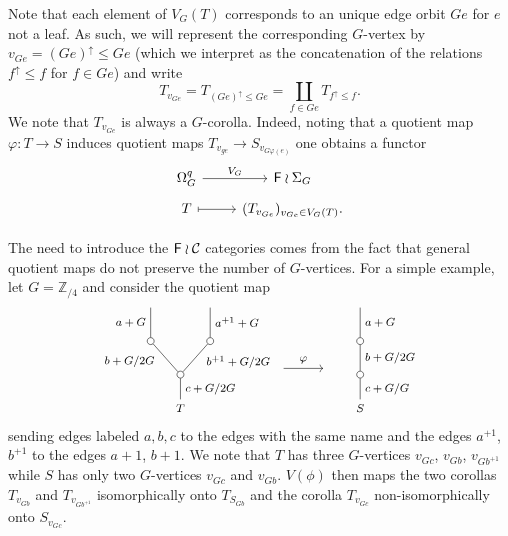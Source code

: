 \documentclass[a4paper,10pt]{article}%
\begin{document}
Note that each element of $V_G(T)$ corresponds to an unique edge orbit $Ge$ for $e$ not a leaf. As such, we will represent the corresponding $G$-vertex by $v_{Ge}=(Ge)^{\uparrow} \leq Ge$ (which we interpret as the concatenation of the relations $f^{\uparrow} \leq f$ for $f \in G e$) and write
\[T_{v_{Ge}}=T_{(Ge)^{\uparrow} \leq Ge} = \coprod_{f\in Ge} T_{f^{\uparrow}\leq f}.\]
We note that $T_{v_{Ge}}$ is always a $G$-corolla. Indeed, noting that a quotient map $\varphi \colon T \to S$ induces quotient maps 
$T_{v_{ge}} \to S_{v_{G\varphi(e)}}$ one obtains a functor
\begin{equation}\label{VFUNCTOR EQ}
  \begin{tikzcd}[row sep=tiny]
    \Omega_G^q \ar{r}{V_G} & \Fin \wr \Sigma_G \\
    T \ar[mapsto]{r} & (T_{v_{Ge}})_{v_{Ge} \in V_G(T)}.
  \end{tikzcd}	
\end{equation}

\begin{remark}
  The need to introduce the $\mathsf{F} \wr \mathcal{C}$ categories comes from the fact that general quotient maps do not preserve the number of $G$-vertices. For a simple example, let $G=\mathbb{Z}_{/4}$ and consider the quotient map
  \[
  \begin{tikzpicture}[grow=up,auto,level distance=2.4em,every node/.style = {font=\footnotesize},dummy/.style={circle,draw,inner sep=0pt,minimum size=1.75mm}]
    \node at (0,0) {$T$}
    child{node [dummy] {}
      child{node [dummy] {}
        child{
          edge from parent node [swap] {$a^{+1} + G$}}
        edge from parent node[near end,swap] {$b^{+1} + G/2G$}}
      child{node [dummy] {}
        child{
          edge from parent node {$a + G$}}
        edge from parent node [near end] {$b + G/2G$}}		
      edge from parent node[swap] {$c + G/2G$}};
    \node at (4.53,0) {$S$}
    child{node [dummy] {}
      child{node [dummy] {}
        child{
          edge from parent node [swap] {$a + G$}}
        edge from parent node [swap] {$b + G/2G$}}
      edge from parent node [swap] {$c + G/G$}};
    \draw[->] (2.6,1) -- node [above] {$\varphi$} (3.6,1) ;
  \end{tikzpicture}
  \]
  sending edges labeled $a,b,c$ to the edges with the same name and the edges $a^{+1}$, $b^{+1}$ to the edges $a+1$, $b+1$. We note that $T$ has three $G$-vertices $v_{Gc}$, $v_{Gb}$, $v_{Gb^{+1}}$ while $S$ has only two $G$-vertices $v_{Gc}$ and $v_{Gb}$. $V(\phi)$ then maps the two corollas 
  $T_{v_{Gb}}$ and $T_{v_{G b^{+1}}}$
  isomorphically onto $T_{S_{Gb}}$
  and the corolla $T_{v_{Gc}}$ non-isomorphically onto $S_{v_{Gc}}$.
\end{remark}
\end{document}
